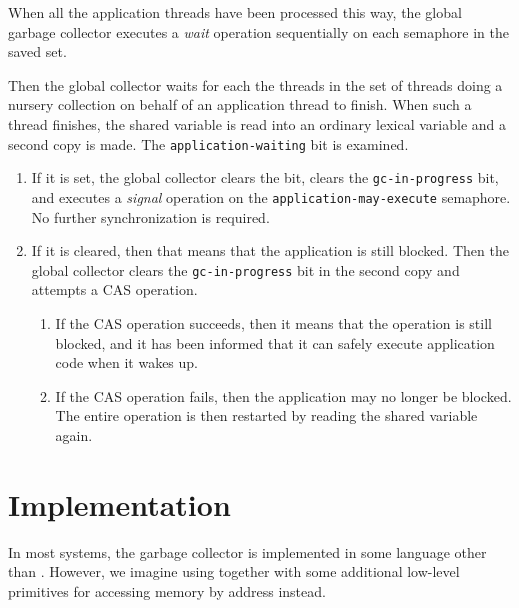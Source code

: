 When all the application threads have been processed this way, the
global garbage collector executes a \emph{wait} operation sequentially
on each semaphore in the saved set.

Then the global collector waits for each the threads in the set of
threads doing a nursery collection on behalf of an application thread
to finish.  When such a thread finishes, the shared variable is read
into an ordinary lexical variable and a second copy is made.  The
\texttt{application-waiting} bit is examined.

\begin{enumerate}
\item If it is set, the global collector clears the bit, clears the
  \texttt{gc-in-progress} bit, and executes a \emph{signal} operation
  on the \texttt{application-may-execute} semaphore.  No further
  synchronization is required.
\item  If it is cleared, then that means that the application is still
  blocked.  Then the global collector clears the
  \texttt{gc-in-progress} bit in the second copy and attempts a CAS
  operation.
  \begin{enumerate}
  \item If the CAS operation succeeds, then it means that the
    operation is still blocked, and it has been informed that it can
    safely execute application code when it wakes up.
  \item If the CAS operation fails, then the application may no longer be
    blocked.  The entire operation is then restarted by reading the
    shared variable again.
  \end{enumerate}
\end{enumerate}

\section{Implementation}

In most systems, the garbage collector is implemented in some language
other than \commonlisp{}.  However, we imagine using \commonlisp{}
together with some additional low-level primitives for accessing
memory by address instead.

